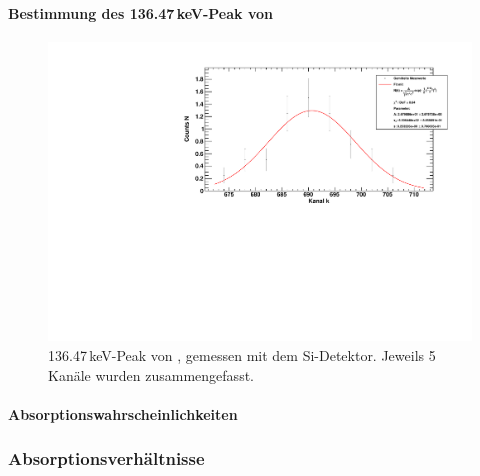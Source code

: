 \paragraph{Bestimmung des 136.47\,keV-Peak von \co}

\begin{figure}[H]
\begin{center}
  \includegraphics[width=\textwidth]{../img/part3/Co-Si_01_mergedbins.pdf}
  \caption{136.47\,keV-Peak von \co, gemessen mit dem Si-Detektor. Jeweils 5 Kanäle wurden zusammengefasst.}
  \label{img:co:si:peak1}
\end{center}
\end{figure}

\paragraph{Absorptionswahrscheinlichkeiten}

\subsubsection{Absorptionsverhältnisse}